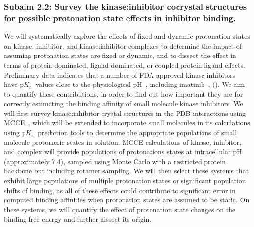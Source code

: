 \documentclass[10pt,final]{article}
\newcommand{\pKa}{p$K_\mathrm{a}$\ }
\newcommand{\pH}{p$\mathrm{H}$\ }
\begin{document}
\subsubsection*{Subaim 2.2: Survey the kinase:inhibitor cocrystal structures for possible protonation state effects in inhibitor binding.}
We will systematically explore the effects of fixed and dynamic protonation states on kinase, inhibitor, and kinase:inhibitor complexes to determine the impact of assuming protonation states are fixed or dynamic, and to dissect the effect in terms of protein-dominated, ligand-dominated, or coupled protein-ligand effects.
%
Preliminary data indicates that a number of FDA approved kinase inhibitors have \pKa values close to the physiological \pH{}, including imatinib~\autocite{Szakacs2005a}, ().
%
We aim to quantify these contributions, in order to find out how important they are for correctly estimating the binding affinity of small molecule kinase inhibitors.
%
We will first survey kinase:inhibitor crystal structures in the PDB interactions using MCCE~\autocite{Song2009a}, which will be extended to incorporate small molecules in its calculations using \pKa prediction tools to determine the appropriate populations of small molecule protomeric states in solution.
%
MCCE calculations of kinase, inhibitor, and complex will provide populations of protonations states at intracellular pH (approximately 7.4), sampled using Monte Carlo with a restricted protein backbone but including rotamer sampling.
%
We will then select those systems that exhibit large populations of multiple protonation states or significant population shifts of binding, as all of these effects could contribute to significant error in computed binding affinities when protonation states are assumed to be static.
%
On these systems, we will quantify the effect of protonation state changes on the binding free energy and further dissect its origin.
\end{document}
